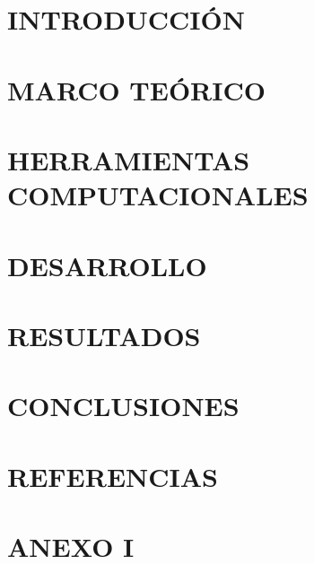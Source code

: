 \tableofcontents

\pagebreak
\renewcommand{\listfigurename}{Índice de Figuras}
\listoffigures
\pagebreak
\renewcommand{\listtablename}{Índice de Tablas}
\listoftables
\pagebreak


{}

\chapter{INTRODUCCIÓN}\label{capitulo:INTRODUCCION}
 \pagebreak

\chapter{MARCO TEÓRICO}\label{capitulo:MARCO_TEORICO}
 \pagebreak

\chapter{HERRAMIENTAS COMPUTACIONALES}\label{capitulo:HERRAMIENTAS_COMPUTACIONALES}
 \pagebreak

\chapter{DESARROLLO}\label{capitulo:DESARROLLO}
 \pagebreak

\chapter{RESULTADOS}\label{capitulo:RESULTADOS}
 \pagebreak

\chapter{CONCLUSIONES}\label{capitulo:CONCLUSIONES}
 \pagebreak

\chapter{REFERENCIAS}
\printbibliography[heading=none] \pagebreak

\chapter{ANEXO I}
 \pagebreak



